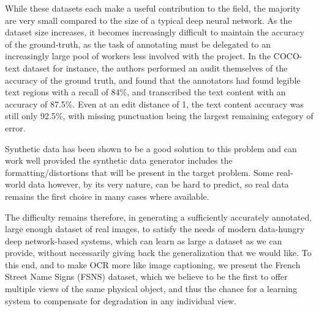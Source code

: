 \documentclass[runningheads]{llncs}
\begin{document}
While these datasets each make a useful contribution to the field, the majority are very small compared
 to the size of a typical deep neural network. As the dataset size increases, it becomes increasingly
 difficult to maintain the accuracy of the ground-truth, as the task of annotating must be delegated
 to an increasingly large pool of workers less involved with the project.
 In the COCO-text \cite{veit2016coco} dataset for instance, the authors performed an audit themselves
 of the accuracy of the ground truth, and found that the annotators had found legible text regions
 with a recall of 84\%, and transcribed the text content with an accuracy of 87.5\%. Even at an edit
 distance of 1, the text content accuracy was still only 92.5\%, with missing punctuation being the
 largest remaining category of error.

Synthetic data has been shown \cite{Jaderberg14c} to be a good solution to this problem and can work well
provided the synthetic data generator includes the formatting/distortions that will be present in the
target problem. Some real-world data however, by its very nature, can be hard to predict, so real data
remains the first choice in many cases where available.

The difficulty remains therefore, in generating a sufficiently accurately annotated, large enough dataset
of real images, to satisfy the needs of modern data-hungry deep network-based systems, which can learn as
large a dataset as we can provide, without necessarily giving back the generalization that we would like.
To this end, and to make OCR more like image captioning, we present the French Street Name Signs (FSNS)
dataset, which we believe to be the first to offer multiple views of the same physical object, and thus
the chance for a learning system to compensate for degradation in any individual view.
\end{document}
